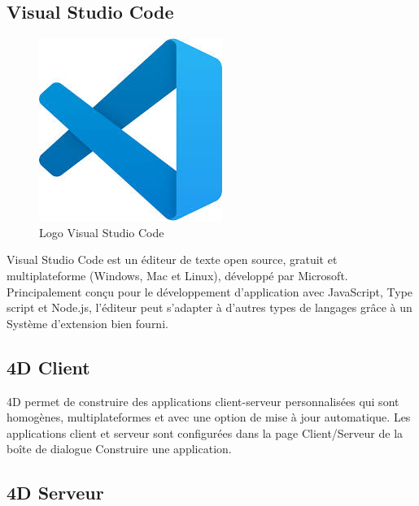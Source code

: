 \subsection{Visual Studio Code }

\begin{figure}[H]
    \centering
    \includegraphics[scale=0.25]{Logos/VS.jpg}
    \caption{Logo Visual Studio Code }
\end{figure}

Visual Studio Code est un éditeur de texte open source, gratuit et multiplateforme (Windows, Mac et Linux), développé
par Microsoft. Principalement conçu pour le développement
d’application avec JavaScript, Type script et Node.js, l’éditeur peut s’adapter à d’autres types de langages grâce à un
Système d’extension bien fourni. \cite{VS}

\subsection{4D Client}

4D  permet de construire des applications client-serveur personnalisées qui sont homogènes, multiplateformes
et avec une option de mise à jour automatique. Les applications client et serveur sont configurées dans la page
Client/Serveur de la boîte de dialogue Construire une application.

\subsection{4D Serveur}



